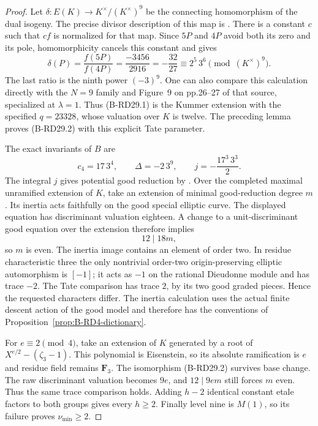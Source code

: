 \begin{proof}
Let $\delta:E(K)\to K^\times/(K^\times)^9$ be the connecting
homomorphism of the dual isogeny. The precise divisor description
of this map is \cite[Appendix~A.1, Lemmas~A.1--A.2, p.22]{AntieauAuel2021Descent}.
There is a constant $c$ such that $cf$ is normalized for that
map. Since $5P$ and $4P$ avoid both its zero and its pole,
homomorphicity cancels this constant and gives
\[
 \delta(P)=\frac{f(5P)}{f(4P)}
       =\frac{-3456}{2916}
       =-\frac{32}{27}
       \equiv2^5\,3^6\pmod{(K^\times)^9}.               \tag{B-RD29.7}
\]
The last ratio is the ninth power $(-3)^9$. One can also compare
this calculation directly with the $N=9$ family and Figure~9 on
pp.26--27 of that source, specialized at $\lambda=1$.
Thus (B-RD29.1) is the Kummer extension with the specified
$q=23328$, whose valuation over $K$ is twelve. The preceding
lemma proves (B-RD29.2) with this explicit Tate parameter.

The exact invariants of $B$ are
\[
 c_4=17\,3^4,\qquad \Delta=-2\,3^9,
 \qquad j=-\frac{17^3\,3^3}{2}.                          \tag{B-RD29.8}
\]
The integral $j$ gives potential good reduction by
\cite[Section~2, p.496]{SerreTate1968Good}.
Over the completed maximal unramified extension of $K$, take
an extension of minimal good-reduction degree $m$. Its inertia
acts faithfully on the good special elliptic curve.
The displayed equation has discriminant valuation eighteen.
A change to a unit-discriminant good equation over the extension
therefore implies
\[
                            12\mid18m,
\]
so $m$ is even. The inertia image contains an element of order
two. In residue characteristic three the only nontrivial
order-two origin-preserving elliptic automorphism is $[-1]$;
it acts as $-1$ on the rational Dieudonne module and has trace
$-2$. The Tate comparison has trace $2$, by its two good graded
pieces. Hence the requested characters differ.
The inertia calculation uses the actual finite descent action
of the good model and therefore has the conventions of
Proposition~\ref{prop:B-RD4-dictionary}.

For $e\equiv2\pmod4$, take an extension of $K$ generated by a
root of $X^{e/2}-(\zeta_3-1)$. This polynomial is Eisenstein,
so its absolute ramification is $e$ and residue field remains
$\mathbf F_3$. The isomorphism (B-RD29.2) survives base change.
The raw discriminant valuation becomes $9e$, and
$12\mid9em$ still forces $m$ even. Thus the same trace
comparison holds. Adding $h-2$ identical constant etale factors
to both groups gives every $h\geq2$. Finally level nine is
$M(1)$, so its failure proves $\nu_{\min}\geq2$.
\end{proof}

